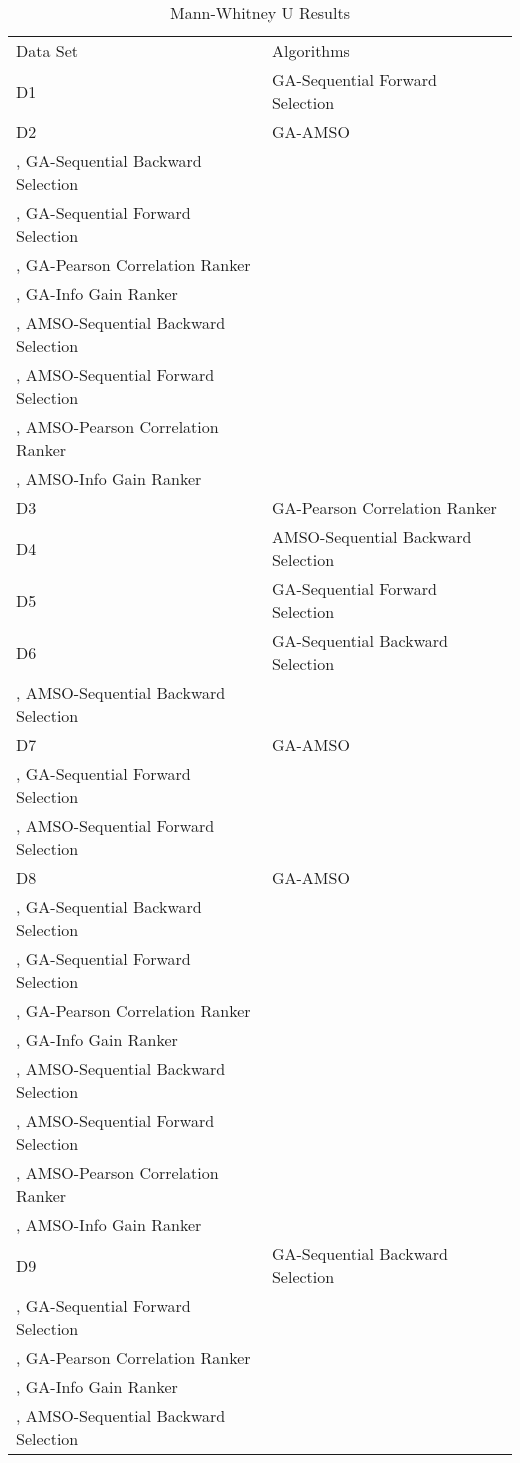 \begin{table}
\caption{Mann-Whitney U Results}
\label{tbl:mann:whitney:u}
\begin{tabular}{ll}
\noalign{\smallskip}\hline\noalign{\smallskip}
Data Set & Algorithms \\
\noalign{\smallskip}\hline
D1&GA-Sequential Forward Selection\\
D2&GA-AMSO\\
, GA-Sequential Backward Selection\\
, GA-Sequential Forward Selection\\
, GA-Pearson Correlation Ranker\\
, GA-Info Gain Ranker\\
, AMSO-Sequential Backward Selection\\
, AMSO-Sequential Forward Selection\\
, AMSO-Pearson Correlation Ranker\\
, AMSO-Info Gain Ranker\\
D3&GA-Pearson Correlation Ranker\\
D4&AMSO-Sequential Backward Selection\\
D5&GA-Sequential Forward Selection\\
D6&GA-Sequential Backward Selection\\
, AMSO-Sequential Backward Selection\\
D7&GA-AMSO\\
, GA-Sequential Forward Selection\\
, AMSO-Sequential Forward Selection\\
D8&GA-AMSO\\
, GA-Sequential Backward Selection\\
, GA-Sequential Forward Selection\\
, GA-Pearson Correlation Ranker\\
, GA-Info Gain Ranker\\
, AMSO-Sequential Backward Selection\\
, AMSO-Sequential Forward Selection\\
, AMSO-Pearson Correlation Ranker\\
, AMSO-Info Gain Ranker\\
D9&GA-Sequential Backward Selection\\
, GA-Sequential Forward Selection\\
, GA-Pearson Correlation Ranker\\
, GA-Info Gain Ranker\\
, AMSO-Sequential Backward Selection\\

\end{tabular}
\end{table}
